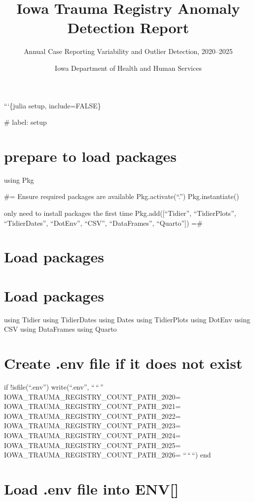 \documentclass[
  12pt,
  letterpaper,
  DIV=11,
  numbers=noendperiod]{scrartcl}
\title{Iowa Trauma Registry Anomaly Detection Report}
\subtitle{Annual Case Reporting Variability and Outlier Detection,
2020--2025}
\author{Iowa Department of Health and Human Services}
\date{}
\renewcommand*\contentsname{Table of contents}
\newcommand\contentsname{Table of contents}
\begin{document}
\maketitle

\renewcommand*\contentsname{Table of contents}
{
\setcounter{tocdepth}{3}
\tableofcontents
}

```\{julia setup, include=FALSE\}

\#\textbar{} label: setup

\section{prepare to load packages}\label{prepare-to-load-packages}

using Pkg

\#= Ensure required packages are available Pkg.activate(``.'')
Pkg.instantiate()

only need to install packages the first time Pkg.add({[}``Tidier'',
``TidierPlots'', ``TidierDates'', ``DotEnv'', ``CSV'', ``DataFrames'',
``Quarto''{]}) =\#

\section{Load packages}\label{load-packages}

\section{Load packages}\label{load-packages-1}

using Tidier using TidierDates using Dates using TidierPlots using
DotEnv using CSV using DataFrames using Quarto

\section{Create .env file if it does not
exist}\label{create-.env-file-if-it-does-not-exist}

if !isfile(``.env'') write(``.env'', ``\,``\,''
IOWA\_TRAUMA\_REGISTRY\_COUNT\_PATH\_2020=
IOWA\_TRAUMA\_REGISTRY\_COUNT\_PATH\_2021=
IOWA\_TRAUMA\_REGISTRY\_COUNT\_PATH\_2022=
IOWA\_TRAUMA\_REGISTRY\_COUNT\_PATH\_2023=
IOWA\_TRAUMA\_REGISTRY\_COUNT\_PATH\_2024=
IOWA\_TRAUMA\_REGISTRY\_COUNT\_PATH\_2025=
IOWA\_TRAUMA\_REGISTRY\_COUNT\_PATH\_2026= ``\,``\,``) end

\section{Load .env file into ENV{[}{]}}\label{load-.env-file-into-env}
\end{document}

